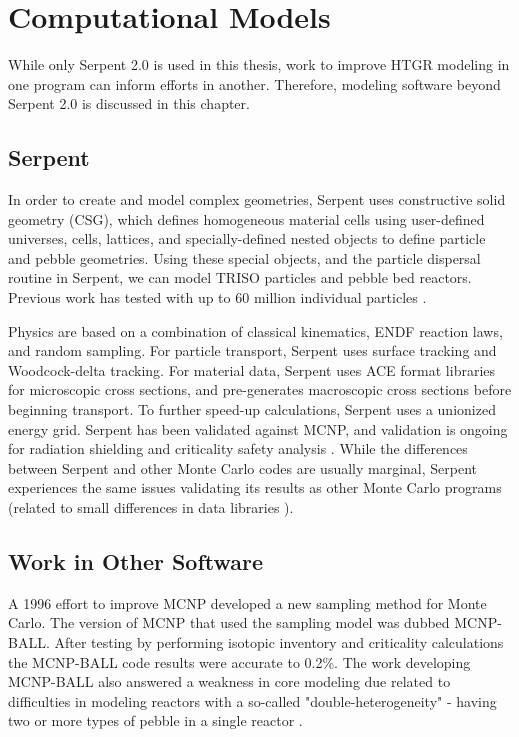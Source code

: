 
\section{Computational Models}

While only Serpent 2.0 \cite{leppanenjaakko_serpent_2015} is used in this thesis, work to improve HTGR modeling in one program can inform efforts in another.  Therefore, modeling software beyond Serpent 2.0 is discussed in this chapter.

\subsection{Serpent}

In order to create and model complex geometries, Serpent uses constructive solid geometry (CSG), which defines homogeneous material cells using user-defined universes, cells, lattices, and specially-defined nested objects to define particle and pebble geometries.  Using these special objects, and the particle dispersal routine in Serpent, we can model TRISO particles and pebble bed reactors.  Previous work has tested with up to 60 million individual particles \cite{noauthor_serpent_nodate}.

Physics are based on a combination of classical kinematics, ENDF reaction laws, and random sampling.  For particle transport, Serpent uses surface tracking and Woodcock-delta tracking.  For material data, Serpent uses ACE format libraries for microscopic cross sections, and pre-generates macroscopic cross sections before beginning transport.  To further speed-up calculations, Serpent uses a unionized energy grid.  Serpent has been validated against MCNP, and validation is ongoing for radiation shielding and criticality safety analysis \cite{noauthor_serpent_nodate}.  While the differences between Serpent and other Monte Carlo codes are usually marginal, Serpent experiences the same issues validating its results as other Monte Carlo programs (related to small differences in data libraries \cite{noauthor_serpent_nodate}).

\subsection{Work in Other Software}

A 1996 effort to improve MCNP developed a new sampling method for Monte Carlo.  The version of MCNP that used the sampling model was dubbed MCNP-BALL.  After testing by performing isotopic inventory and criticality calculations the MCNP-BALL code results were accurate to 0.2\%.  The work developing MCNP-BALL also answered a weakness in core modeling due related to difficulties in modeling reactors with a so-called "double-heterogeneity" - having two or more types of pebble in a single reactor \cite{murata_new_1997}.

